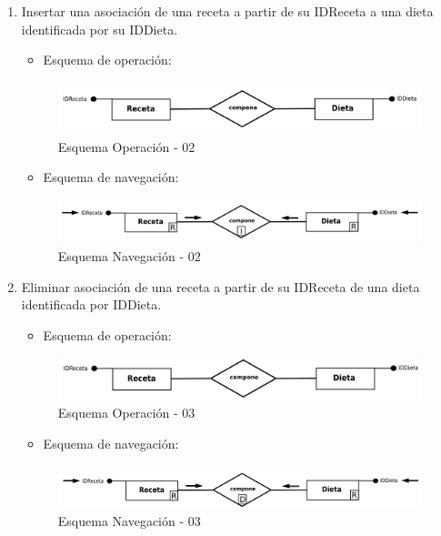 \documentclass[a4paper,12pt]{report}
\begin{document}
\begin{enumerate}
\item Insertar una asociación de una receta a partir de su IDReceta a
una dieta identificada por su IDDieta.
\begin{itemize}
\item Esquema de operación:
\end{itemize}
\begin{figure}[!htp]
\centering
\includegraphics[width=0.9\linewidth]{./operaciones/img/Dietas/02_ope.png}
\caption{Esquema Operación - 02}
\label{fig:ope02}
\medskip
\footnotesize
{}
\end{figure}
\begin{itemize}
\item Esquema de navegación:
\end{itemize}
\begin{figure}[!htp]
\centering
\includegraphics[width=0.9\linewidth]{./operaciones/img/Dietas/02_nav.png}
\caption{Esquema Navegación - 02}
\label{fig:nave02}
\medskip
\footnotesize
{}
\end{figure}

\item Eliminar asociación de una receta a partir de su IDReceta de
una dieta identificada por IDDieta.
\begin{itemize}
\item Esquema de operación:
\end{itemize}
\begin{figure}[!htp]
\centering
\includegraphics[width=0.9\linewidth]{./operaciones/img/Dietas/03_ope.png}
\caption{Esquema Operación - 03}
\label{fig:ope03}
\medskip
\footnotesize
{}
\end{figure}
\begin{itemize}
\item Esquema de navegación:
\end{itemize}
\begin{figure}[!htp]
\centering
\includegraphics[width=0.9\linewidth]{./operaciones/img/Dietas/03_nav.png}
\caption{Esquema Navegación - 03}
\label{fig:nave03}
\medskip
\footnotesize
{}
\end{figure}


\end{enumerate}
\end{document}
